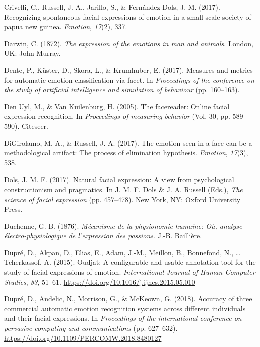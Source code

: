 \documentclass[man]{apa6}
\begin{document}
\leavevmode\hypertarget{ref-crivelli2017recognizing}{}%
Crivelli, C., Russell, J. A., Jarillo, S., \& Fernández-Dols, J.-M. (2017). Recognizing spontaneous facial expressions of emotion in a small-scale society of papua new guinea. \emph{Emotion}, \emph{17}(2), 337.

\leavevmode\hypertarget{ref-darwin1872expression}{}%
Darwin, C. (1872). \emph{The expression of the emotions in man and animals}. London, UK: John Murray.

\leavevmode\hypertarget{ref-dente2017measures}{}%
Dente, P., Küster, D., Skora, L., \& Krumhuber, E. (2017). Measures and metrics for automatic emotion classification via facet. In \emph{Proceedings of the conference on the study of artificial intelligence and simulation of behaviour} (pp. 160--163).

\leavevmode\hypertarget{ref-den2005facereader}{}%
Den Uyl, M., \& Van Kuilenburg, H. (2005). The facereader: Online facial expression recognition. In \emph{Proceedings of measuring behavior} (Vol. 30, pp. 589--590). Citeseer.

\leavevmode\hypertarget{ref-digirolamo2017emotion}{}%
DiGirolamo, M. A., \& Russell, J. A. (2017). The emotion seen in a face can be a methodological artifact: The process of elimination hypothesis. \emph{Emotion}, \emph{17}(3), 538.

\leavevmode\hypertarget{ref-dols2017natural}{}%
Dols, J. M. F. (2017). Natural facial expression: A view from psychological constructionism and pragmatics. In J. M. F. Dols \& J. A. Russell (Eds.), \emph{The science of facial expression} (pp. 457--478). New York, NY: Oxford University Press.

\leavevmode\hypertarget{ref-duchenne1876mecanisme}{}%
Duchenne, G.-B. (1876). \emph{Mécanisme de la physionomie humaine: Où, analyse électro-physiologique de l'expression des passions}. J.-B. Baillière.

\leavevmode\hypertarget{ref-dupre2015oudjat}{}%
Dupré, D., Akpan, D., Elias, E., Adam, J.-M., Meillon, B., Bonnefond, N., \ldots{} Tcherkassof, A. (2015). Oudjat: A configurable and usable annotation tool for the study of facial expressions of emotion. \emph{International Journal of Human-Computer Studies}, \emph{83}, 51--61. \url{https://doi.org/10.1016/j.ijhcs.2015.05.010}

\leavevmode\hypertarget{ref-dupre2018accuracy}{}%
Dupré, D., Andelic, N., Morrison, G., \& McKeown, G. (2018). Accuracy of three commercial automatic emotion recognition systems across different individuals and their facial expressions. In \emph{Proceedings of the international conference on pervasive computing and communications} (pp. 627--632). \url{https://doi.org/10.1109/PERCOMW.2018.8480127}
\end{document}
